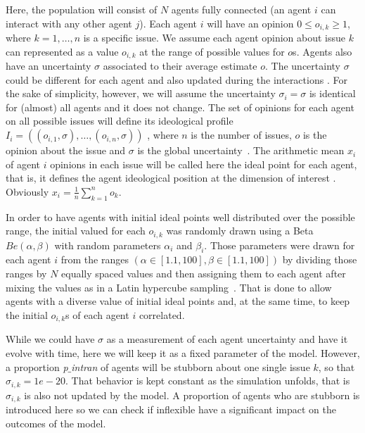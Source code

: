 \documentclass{article}
\begin{document}
Here, the population will consist of  \(N\) agents fully connected (an agent $i$ can interact with any other agent $j$). Each agent $i$ will have an opinion $0\leq o_{i,k} \geq 1$, where $k=1, \ldots, n$ is a specific issue. We assume each agent opinion about issue $k$ can represented as a value $o_{i,k}$ at the range of possible values for $o$s. Agents also have an uncertainty $\sigma$ associated to their average estimate $o$. The uncertainty $\sigma$ could be different for each agent and also updated during the interactions \cite{martins08c}. For the sake of simplicity, however, we will assume the uncertainty $\sigma_i =\sigma$ is identical for (almost) all agents and it does not change. The set of opinions for each agent on all possible issues will define its ideological profile
\(I_i
=
(
(o_{i, 1}, \sigma),
\ldots,
(o_{i, n}, \sigma)
)
\)
, where \(n\) is the number of issues, \(o\) is
the opinion about the issue and \(\sigma\) is the global  uncertainty~\cite{martins12b}. The arithmetic mean  $x_i$  of agent $i$ opinions in each issue will be called here the ideal point for each agent, that is, it defines the agent ideological position at the
dimension of interest \cite{armstrong2014analyzing}. Obviously
\(
x_i
=
\frac{1}{n}
\sum_{k=1}^{n}
o_{k}
\).


In order to have agents with initial ideal points well distributed over the
possible range, the initial valued for each \(o_{i, k}\) was randomly drawn
using a Beta \(Be(\alpha, \beta)\) with random parameters $\alpha_i$ and
$\beta_i$. Those parameters were drawn for each agent $i$ from the ranges \( (
\alpha \in [1.1, 100], \beta \in [1.1, 100] ) \) by dividing those ranges by
\(N\) equally spaced values and then assigning them to each agent after mixing
the values as in a Latin hypercube sampling~\cite{mckay2000comparison}. That is done to
allow agents with a diverse value of initial ideal points and, at the same time,
to keep the initial \(o_{i, k}\)s of each agent $i$ correlated.

While we could have \(\sigma\) as a measurement of each agent uncertainty and have it evolve with time, here we will keep it as a fixed parameter of the model. However, a
proportion \textit{p$\_$intran} of agents will be stubborn about one single issue $k$, so that \(\sigma_{i,k}
= 1e-20\). That behavior is kept constant as the simulation unfolds, that is $\sigma_{i,k}$ is also not updated by the model. A proportion of agents who are stubborn is introduced here so we can check if inflexible \cite{galam05b,deffuant2002can,martinsgalam13a} have a significant impact on the outcomes of the model.
\end{document}
